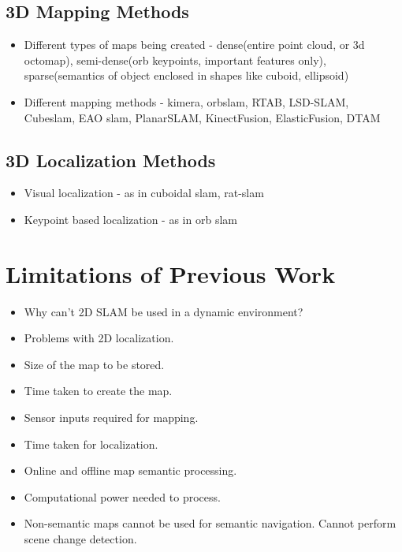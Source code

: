 \documentclass[report.tex]{subfiles}
\begin{document}
    \subsection{3D Mapping Methods}
    \begin{itemize}
        \item Different types of maps being created - dense(entire point cloud, or 3d octomap), semi-dense(orb keypoints, important features only), sparse(semantics of object enclosed in shapes like cuboid, ellipsoid)
        \item Different mapping methods - kimera, orbslam, RTAB, LSD-SLAM, Cubeslam, EAO slam, PlanarSLAM, KinectFusion, ElasticFusion, DTAM
    \end{itemize}

    \subsection{3D Localization Methods}
    \begin{itemize}
        \item Visual localization - as in cuboidal slam, rat-slam 
        \item Keypoint based localization - as in orb slam
    \end{itemize}

    
    \section{Limitations of Previous Work}
    \begin{itemize}
        \item Why can't 2D SLAM be used in a dynamic environment?
        \item Problems with 2D localization.
        \item Size of the map to be stored.
        \item Time taken to create the map.
        \item Sensor inputs required for mapping.
        \item Time taken for localization.
        \item Online and offline map semantic processing.
        \item Computational power needed to process.
        \item Non-semantic maps cannot be used for semantic navigation. Cannot perform scene change detection.
    \end{itemize}


    
\end{document}
